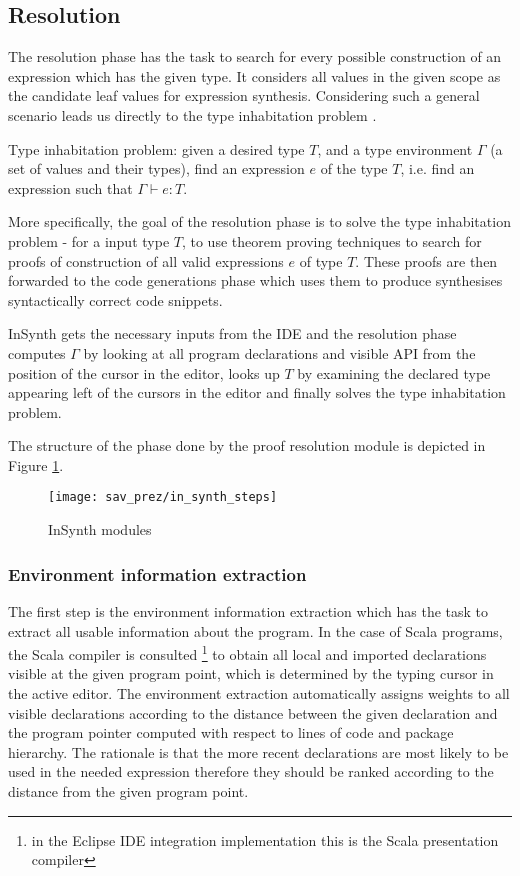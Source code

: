 \subsection{Resolution}

The resolution phase has the task to search for every possible construction of an expression which has the given type. 
It considers all values in the given scope as the candidate leaf values for expression synthesis.
Considering such a general scenario leads us directly to the type inhabitation problem \cite{EPFL-REPORT-170040,Urzyczyn:1997:ITL:645893.671612}.
\begin{definition}
\label{def:inhabitation_problem}
Type inhabitation problem:
given a desired type $T$, and a type environment $\Gamma$ (a set of values and their types), find an expression $e$ of the type $T$, i.e. find an expression such that $\Gamma \vdash e : T$.
\end{definition}
More specifically, the goal of the resolution phase is to solve the type inhabitation problem - for a input type $T$, to use theorem proving techniques to search for proofs of construction of all valid expressions $e$ of type $T$.
These proofs are then forwarded to the code generations phase which uses them to produce synthesises syntactically correct code snippets.

InSynth gets the necessary inputs from the IDE and the resolution phase computes $\Gamma$ by looking at all program declarations and visible API from the position of the cursor in the editor, looks up $T$ by examining the declared type appearing left of the cursors in the editor and finally solves the type inhabitation problem.

The structure of the phase done by the proof resolution module is depicted in Figure \ref{fig:InSynth_resolution_steps}.

\begin{figure}[ht]
\centering
\texttt{[image: sav\_prez/in\_synth\_steps]}
\caption{InSynth modules}
\label{fig:InSynth_resolution_steps}
\end{figure}

\subsubsection{Environment information extraction}

The first step is the environment information extraction which has the task to extract all usable information about the program.
In the case of Scala programs, the Scala compiler is consulted
\footnote{in the Eclipse IDE integration implementation this is the Scala presentation compiler}
to obtain all local and imported declarations visible at the given program point, which is determined by the typing cursor in the active editor.
The environment extraction automatically assigns weights to all visible declarations according to the distance between the given declaration and the program pointer computed with respect to lines of code and package hierarchy.
The rationale is that the more recent declarations are most likely to be used in the needed expression therefore they should be ranked according to the distance from the given program point.

